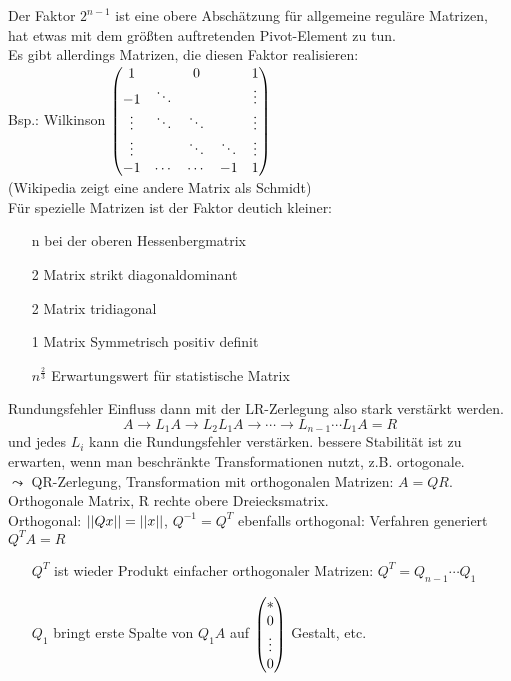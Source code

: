 \documentclass[../Skript.tex]{subfiles}
\begin{document}
Der Faktor \(2^{n-1}\) ist eine  obere Abschätzung für allgemeine reguläre Matrizen, hat etwas mit dem größten auftretenden Pivot-Element zu tun.\\
Es gibt allerdings Matrizen, die diesen Faktor realisieren: \\
Bsp.: Wilkinson 
\(\begin{pmatrix}1 & & 0 & & 1\\-1 & \ddots & & & \vdots\\ \vdots & \ddots & \ddots & & 
\vdots\\\vdots  & & \ddots & \ddots & \vdots\\ -1 & \cdots & \cdots & -1 & 1\\\end{pmatrix}\)\\
(Wikipedia zeigt eine andere Matrix als Schmidt)
\\
Für spezielle Matrizen ist der Faktor deutich kleiner:
 \begin{itemize}
     \item[n] bei der oberen Hessenbergmatrix
     \item[2] Matrix strikt diagonaldominant
     \item[2] Matrix tridiagonal
     \item[1] Matrix Symmetrisch positiv definit
     \item[\(n^\frac{2}{3}\)] Erwartungswert für statistische Matrix
 \end{itemize}

 Rundungsfehler Einfluss dann mit der LR-Zerlegung also stark verstärkt werden. \[
 A\to L_1 A \to L_2L_1A\to \cdots \to L_{n-1}\cdots L_1A=R
 \]
und jedes \(L_i\) kann die Rundungsfehler verstärken. bessere Stabilität ist zu erwarten, wenn man beschränkte Transformationen nutzt, z.B. ortogonale.\\
\(\leadsto\) QR-Zerlegung, Transformation mit orthogonalen Matrizen: 
\(A=QR\).\\ Orthogonale Matrix, R rechte obere Dreiecksmatrix.\\
Orthogonal: \(\left\vert\left\vert Qx\right\vert\right\vert=\left\vert\left\vert x\right\vert\right\vert\), \(Q^{-1}=Q^T\) ebenfalls orthogonal: Verfahren generiert \(Q^TA=R\) 
\begin{itemize}
    \item[\(Q^T\)] ist wieder Produkt einfacher orthogonaler Matrizen: \(Q^T=Q_{n-1}\cdots Q_1\)
    \item[\(Q_1\)] bringt erste Spalte von \(Q_1A\) auf \(\begin{pmatrix}\ast \\ 0 \\ \vdots \\ 0\end{pmatrix}\) Gestalt, etc.
\end{itemize}
\end{document}
